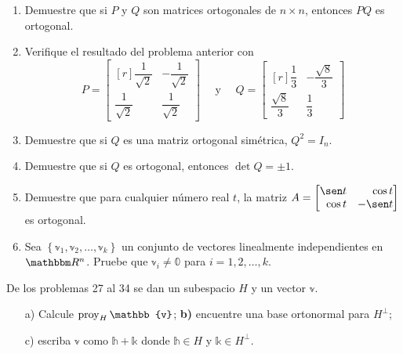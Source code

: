 \begin{enumerate}
    \item Demuestre que si $P$ y $Q$ son matrices ortogonales de $n \times n$, entonces $P Q$ es ortogonal.
    \item Verifique el resultado del problema anterior con
    $$P=\begin{bmatrix*}[r]
        \dfrac{1}{\sqrt{2}} & -\dfrac{1}{\sqrt{2}} \\[3mm]
        \dfrac{1}{\sqrt{2}} & \dfrac{1}{\sqrt{2}}
    \end{bmatrix*} \quad \text{ y } \quad Q=\begin{bmatrix*}[r]
        \dfrac{1}{3} & -\dfrac{\sqrt{8}}{3} \\[3mm]
        \dfrac{\sqrt{8}}{3} & \dfrac{1}{3}
    \end{bmatrix*}$$
    \item Demuestre que si $Q$ es una matriz ortogonal simétrica, $Q^{2}=I_{n}$.
    \item Demuestre que si $Q$ es ortogonal, entonces $\operatorname{det} Q= \pm 1$.
    \item Demuestre que para cualquier número real $t$, la matriz $A=\begin{bmatrix*}[r] \sen t & \cos t \\ \cos t & -\sen t\end{bmatrix*}$ es ortogonal.
    \item Sea $\left\{\mathbb{v}_{1}, \mathbb{v}_{2}, \ldots, \mathbb{v}_{k}\right\}$ un conjunto de vectores linealmente independientes en $\RR[n]$. Pruebe que $\mathbb{v}_{i} \neq \mathbb{0}$ para $i = 1, 2, \ldots, k$.
\end{enumerate}
De los problemas 27 al 34 se dan un subespacio $H$ y un vector $\mathbb{v}$.
\begin{enumerate}
    \item[a)] Calcule $\proy_{H} \mathbb{v}$; \hfill \textbf{b)} encuentre una base ortonormal para $H^{\perp}$;
    \item[c)] escriba $\mathbb{v}$ como $\mathbb{h}+\mathbb{k}$ donde $\mathbb{h} \in H$ y $\mathbb{k} \in H^{\perp}$.
\end{enumerate}
